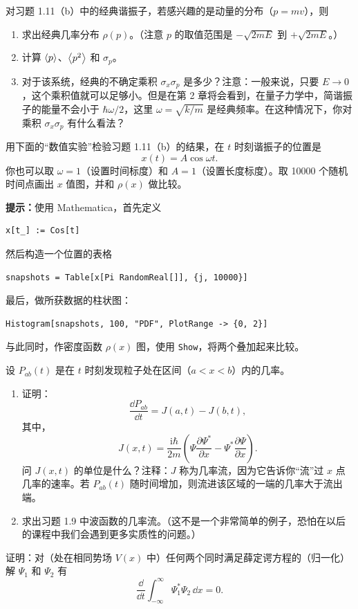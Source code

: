 对习题 1.11（b）中的经典谐振子，若感兴趣的是动量的分布（$p=mv$），则
\begin{enumerate}
\item 求出经典几率分布 $\rho(p)$。（注意 $p$ 的取值范围是 $-\sqrt{2mE}$ 到 $+\sqrt{2mE}$。）
\item 计算 $\left\langle p\right\rangle$、$\left\langle p^2\right\rangle$ 和 $\sigma_p$。
\item 对于该系统，经典的不确定乘积 $\sigma_x\sigma_p$ 是多少？注意：一般来说，只要 $E\to0$，这个乘积值就可以足够小。但是在第 2 章将会看到，在量子力学中，简谐振子的能量不会小于 $\hbar\omega/2$，这里 $\omega=\sqrt{k/m}$ 是经典频率。在这种情况下，你对乘积 $\sigma_x\sigma_p$ 有什么看法？
\end{enumerate}
\vfill

用下面的“数值实验”检验习题 1.11（b）的结果，在 $t$ 时刻谐振子的位置是
\[
x(t)=A\cos\omega t.
\]
你也可以取 $\omega=1$（设置时间标度）和 $A=1$（设置长度标度）。取 10000 个随机时间点画出 $x$ 值图，并和 $\rho(x)$ 做比较。

\textbf{提示：}使用 Mathematica，首先定义
\begin{verbatim}
x[t_] := Cos[t]
\end{verbatim}
然后构造一个位置的表格
\begin{verbatim}
snapshots = Table[x[Pi RandomReal[]], {j, 10000}]
\end{verbatim}
最后，做所获数据的柱状图：
\begin{verbatim}
Histogram[snapshots, 100, "PDF", PlotRange -> {0, 2}]
\end{verbatim}
与此同时，作密度函数 $\rho(x)$ 图，使用 \texttt{Show}，将两个叠加起来比较。
\vfill

设 $P_{ab}(t)$ 是在 $t$ 时刻发现粒子处在区间（$a<x<b$）内的几率。
\begin{enumerate}
\item 证明：
\[
\frac{\dd P_{ab}}{\dd t}=J(a,t)-J(b,t),
\]
其中，
\[
J(x,t)=\frac{\mathrm{i}\hbar}{2m}
\left(\Psi\frac{\partial\Psi^*}{\partial x}
-\Psi^*\frac{\partial\Psi}{\partial x}\right).
\]
问 $J(x,t)$ 的单位是什么？注释：$J$ 称为几率流，因为它告诉你“流”过 $x$ 点几率的速率。若 $P_{ab}(t)$ 随时间增加，则流进该区域的一端的几率大于流出端。
\item 求出习题 1.9 中波函数的几率流。（这不是一个非常简单的例子，恐怕在以后的课程中我们会遇到更多实质性的问题。）
\end{enumerate}
\vfill

证明：对（处在相同势场 $V(x)$ 中）任何两个同时满足薛定谔方程的（归一化）解 $\Psi_1$ 和 $\Psi_2$ 有
\[
\frac{\dd}{\dd t}\int_{-\infty}^{\infty}\Psi_1^*\Psi_2\,\dd x=0.
\]
\vfill

